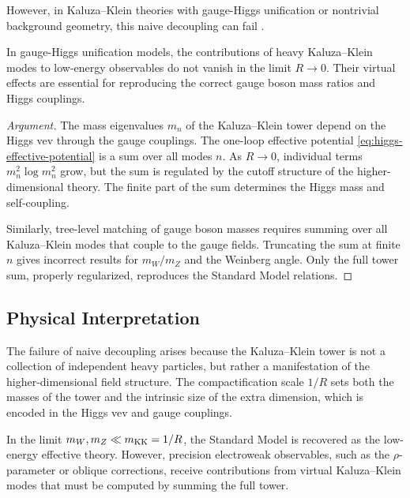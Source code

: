 However, in Kaluza--Klein theories with gauge-Higgs unification or nontrivial
background geometry, this naive decoupling can fail \cite{RandjbarDaemi2006,
Akhoury2008}.

\begin{proposition}
\label{prop:nondecoupling-kk-modes}
In gauge-Higgs unification models, the contributions of heavy Kaluza--Klein modes
to low-energy observables do not vanish in the limit \(R \to 0\).  Their virtual
effects are essential for reproducing the correct gauge boson mass ratios and
Higgs couplings.
\end{proposition}

\begin{proof}[Argument]
The mass eigenvalues \(m_n\) of the Kaluza--Klein tower depend on the Higgs vev
through the gauge couplings.  The one-loop effective potential \eqref{eq:higgs-effective-potential}
is a sum over all modes \(n\).  As \(R \to 0\), individual terms \(m_n^2 \log m_n^2\)
grow, but the sum is regulated by the cutoff structure of the higher-dimensional
theory.  The finite part of the sum determines the Higgs mass and self-coupling.

Similarly, tree-level matching of gauge boson masses requires summing over all
Kaluza--Klein modes that couple to the gauge fields.  Truncating the sum at finite
\(n\) gives incorrect results for \(m_W/m_Z\) and the Weinberg angle.  Only the
full tower sum, properly regularized, reproduces the Standard Model relations.
\end{proof}

\subsection{Physical Interpretation}

The failure of naive decoupling arises because the Kaluza--Klein tower is not a
collection of independent heavy particles, but rather a manifestation of the
higher-dimensional field structure.  The compactification scale \(1/R\) sets both
the masses of the tower and the intrinsic size of the extra dimension, which is
encoded in the Higgs vev and gauge couplings.

\begin{remark}
In the limit \(m_W, m_Z \ll m_{\rm KK} = 1/R\), the Standard Model is recovered
as the low-energy effective theory.  However, precision electroweak observables,
such as the \(\rho\)-parameter or oblique corrections, receive contributions from
virtual Kaluza--Klein modes that must be computed by summing the full tower.
\end{remark}

